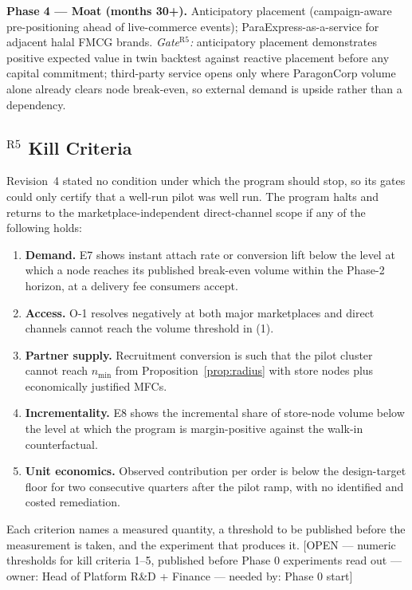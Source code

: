 \documentclass[10pt,twocolumn,letterpaper]{article}
\theoremstyle{definition}
\newcommand{\OPEN}[3]{{\color{openred}\footnotesize\textsf{[OPEN --- #1 --- owner: #2 --- needed by: #3]}}}
\begin{document}
\textbf{Phase 4 --- Moat (months 30+).} Anticipatory placement (campaign-aware pre-positioning ahead of live-commerce events); ParaExpress-as-a-service for adjacent halal FMCG brands.
\emph{Gate}$^{\mathrm{R5}}$\emph{:} anticipatory placement demonstrates positive expected value in twin backtest against reactive placement before any capital commitment; third-party service opens only where ParagonCorp volume alone already clears node break-even, so external demand is upside rather than a dependency.

\subsection{$^{\mathrm{R5}}$ Kill Criteria}
Revision~4 stated no condition under which the program should stop, so its gates could only certify that a well-run pilot was well run. The program halts and returns to the marketplace-independent direct-channel scope if any of the following holds:

\begin{enumerate}
\item \textbf{Demand.} E7 shows instant attach rate or conversion lift below the level at which a node reaches its published break-even volume within the Phase-2 horizon, at a delivery fee consumers accept.
\item \textbf{Access.} O-1 resolves negatively at both major marketplaces and direct channels cannot reach the volume threshold in (1).
\item \textbf{Partner supply.} Recruitment conversion is such that the pilot cluster cannot reach $n_{\min}$ from Proposition~\ref{prop:radius} with store nodes plus economically justified MFCs.
\item \textbf{Incrementality.} E8 shows the incremental share of store-node volume below the level at which the program is margin-positive against the walk-in counterfactual.
\item \textbf{Unit economics.} Observed contribution per order is below the design-target floor for two consecutive quarters after the pilot ramp, with no identified and costed remediation.
\end{enumerate}

Each criterion names a measured quantity, a threshold to be published before the measurement is taken, and the experiment that produces it. \OPEN{numeric thresholds for kill criteria 1--5, published before Phase 0 experiments read out}{Head of Platform R\&D + Finance}{Phase 0 start}
\end{document}
